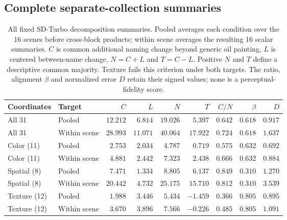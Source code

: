 \subsection{Complete separate-collection summaries}
\begin{table}[!htbp]
\caption{All fixed SD-Turbo decomposition summaries. Pooled averages each condition over the 16 scenes before cross-block products; within scene averages the resulting 16 scalar summaries. $C$ is common additional naming change beyond generic oil painting, $L$ is centered between-name change, $N=C+L$ and $T=C-L$. Positive $N$ and $T$ define a descriptive common majority. Texture fails this criterion under both targets. The ratio, alignment $\beta$ and normalized error $D$ retain their signed values; none is a perceptual-fidelity score.}
\label{tab:cross-cohort-components}
\centering\small\setlength{\tabcolsep}{4pt}
\begin{tabularx}{\linewidth}{@{}Xlrrrrrrr@{}}\toprule
Coordinates & Target & $C$ & $L$ & $N$ & $T$ & $C/N$ & $\beta$ & $D$\\\midrule
All 31 & Pooled & $12.212$ & $6.814$ & $19.026$ & $5.397$ & $0.642$ & $0.618$ & $0.917$\\
All 31 & Within scene & $28.993$ & $11.071$ & $40.064$ & $17.922$ & $0.724$ & $0.618$ & $1.637$\\
\addlinespace[2pt]
Color (11) & Pooled & $2.753$ & $2.034$ & $4.787$ & $0.719$ & $0.575$ & $0.632$ & $0.692$\\
Color (11) & Within scene & $4.881$ & $2.442$ & $7.323$ & $2.438$ & $0.666$ & $0.632$ & $0.884$\\
\addlinespace[2pt]
Spatial (8) & Pooled & $7.471$ & $1.334$ & $8.805$ & $6.137$ & $0.849$ & $0.310$ & $1.270$\\
Spatial (8) & Within scene & $20.442$ & $4.732$ & $25.175$ & $15.710$ & $0.812$ & $0.310$ & $3.539$\\
\addlinespace[2pt]
Texture (12) & Pooled & $1.988$ & $3.446$ & $5.434$ & $-1.459$ & $0.366$ & $0.805$ & $0.895$\\
Texture (12) & Within scene & $3.670$ & $3.896$ & $7.566$ & $-0.226$ & $0.485$ & $0.805$ & $1.091$\\
\bottomrule\end{tabularx}\end{table}
